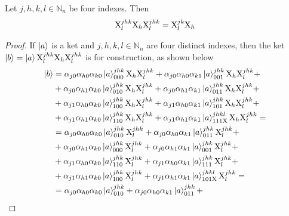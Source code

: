 \documentclass[sigconf,natbib=false]{acmart}
\begin{document}
	\begin{proposition}
		Let $j,h,k,l \in \mathbb{N}_n$ be four indexes.
		Then
		\begin{equation}
			\label{eq:mainresult}
			\text{X}^{jhk}_{l}\text{X}_h\text{X}^{jhk}_{l} = \text{X}^{jk}_{l}\text{X}_h
		\end{equation}
	\end{proposition}
	\begin{proof}
		If $\ket{a}$ is a ket and $j,h,k,l \in \mathbb{N}_n$ are four distinct indexes, then
		the ket
		$\ket{b}=\ket{a}\text{X}^{jhk}_{l}\text{X}_h\text{X}^{jhk}_{l}$
		is for construction, as shown below
		\begin{align*}
			\ket{b}
			&=\alpha_{j0}\alpha_{h0}\alpha_{k0}\stateket{a}{jhk}{000}\gate{X}_h\stategate{X}{jhk}{l} +
			  \alpha_{j0}\alpha_{h0}\alpha_{k1}\stateket{a}{jhk}{001}\gate{X}_h\stategate{X}{jhk}{l}+\\
			&+\alpha_{j0}\alpha_{h1}\alpha_{k0}\stateket{a}{jhk}{010}\gate{X}_h\stategate{X}{jhk}{l} +
			  \alpha_{j0}\alpha_{h1}\alpha_{k1}\stateket{a}{jhk}{011}\gate{X}_h\stategate{X}{jhk}{l}+\\
			&+\alpha_{j1}\alpha_{h0}\alpha_{k0}\stateket{a}{jhk}{100}\gate{X}_h\stategate{X}{jhk}{l} +
			  \alpha_{j1}\alpha_{h0}\alpha_{k1}\stateket{a}{jhk}{101}\gate{X}_h\stategate{X}{jhk}{l}+\\
			&+\alpha_{j1}\alpha_{h1}\alpha_{k0}\stateket{a}{jhk}{110}\gate{X}_h\stategate{X}{jhk}{l} +
			  \alpha_{j1}\alpha_{h1}\alpha_{k1}\stateket{a}{jhkl}{111\gate{X}}\gate{X}_h\stategate{X}{jhk}{l}=\\
			&=\alpha_{j0}\alpha_{h0}\alpha_{k0}\stateket{a}{jhk}{010}\stategate{X}{jhk}{l} +
			  \alpha_{j0}\alpha_{h0}\alpha_{k1}\stateket{a}{jhk}{011}\stategate{X}{jhk}{l}+\\
			&+\alpha_{j0}\alpha_{h1}\alpha_{k0}\stateket{a}{jhk}{000}\stategate{X}{jhk}{l} +
			  \alpha_{j0}\alpha_{h1}\alpha_{k1}\stateket{a}{jhk}{001}\stategate{X}{jhk}{l}+\\
			&+\alpha_{j1}\alpha_{h0}\alpha_{k0}\stateket{a}{jhk}{110}\stategate{X}{jhk}{l} +
			  \alpha_{j1}\alpha_{h0}\alpha_{k1}\stateket{a}{jhk}{111}\stategate{X}{jhk}{l}+\\
			&+\alpha_{j1}\alpha_{h1}\alpha_{k0}\stateket{a}{jhk}{100}\stategate{X}{jhk}{l} +
			  \alpha_{j1}\alpha_{h1}\alpha_{k1}\stateket{a}{jhkl}{101\gate{X}}\stategate{X}{jhk}{l}=\\
			&=\alpha_{j0}\alpha_{h0}\alpha_{k0}\stateket{a}{jhk}{010} +
			  \alpha_{j0}\alpha_{h0}\alpha_{k1}\stateket{a}{jhk}{011}+\\

\end{align*}
\end{proof}
\end{document}
